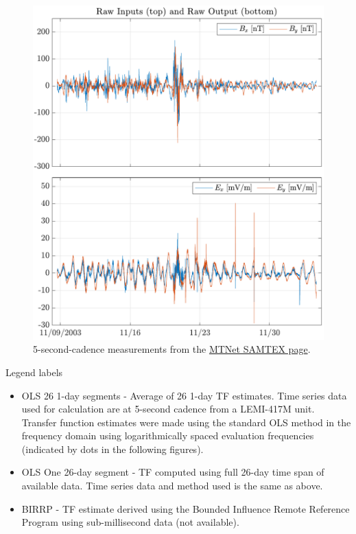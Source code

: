 \documentclass{article}
\begin{document}
\begin{figure}[h!]
\centering
\includegraphics[width=\textwidth]{figures/KAP103/timeseries.pdf}
\caption{5-second-cadence measurements from the \href{https://www.mtnet.info/data/samtex/samtex.html}{MTNet SAMTEX page}.}
\label{fig:KAP103_timeseries}
\end{figure}

\clearpage

Legend labels

\begin{itemize}

    \item OLS 26 1-day segments - Average of 26 1-day TF estimates. Time series data used for calculation are at 5-second cadence from a LEMI-417M unit. Transfer function estimates were made using the standard OLS method in the frequency domain using logarithmically spaced evaluation frequencies (indicated by dots in the following figures).

    \item OLS One 26-day segment - TF computed using full 26-day time span of available data. Time series data and method used is the same as above.

    \item BIRRP - TF estimate derived using the Bounded Influence Remote Reference Program using sub-millisecond data (not available).

\end{itemize}
\end{document}
